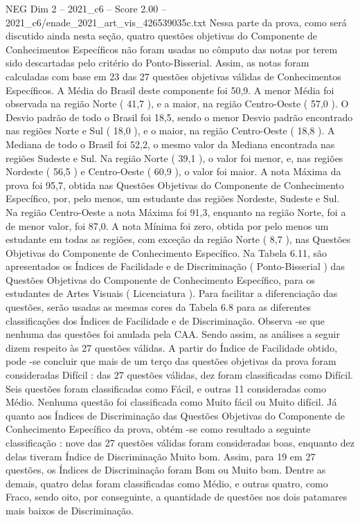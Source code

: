 \begin{textsample}{NEG Dim 2 – 2021\_c6 – Score 2.00 – 2021\_c6/enade\_2021\_art\_vis\_426539035c.txt}
Nessa parte da prova, como será discutido ainda nesta seção, quatro questões objetivas do Componente de Conhecimentos Específicos não foram usadas no cômputo das notas por terem sido descartadas pelo critério do Ponto-Bisserial.
Assim, as notas foram calculadas com base em 23 das 27 questões objetivas válidas de Conhecimentos Específicos.
A Média do Brasil deste componente foi 50,9.
A menor Média foi observada na região Norte ( 41,7 ), e a maior, na região Centro-Oeste ( 57,0 ).
O Desvio padrão de todo o Brasil foi 18,5, sendo o menor Desvio padrão encontrado nas regiões Norte e Sul ( 18,0 ), e o maior, na região Centro-Oeste ( 18,8 ).
A Mediana de todo o Brasil foi 52,2, o mesmo valor da Mediana encontrada nas regiões Sudeste e Sul.
Na região Norte ( 39,1 ), o valor foi menor, e, nas regiões Nordeste ( 56,5 ) e Centro-Oeste ( 60,9 ), o valor foi maior.
A nota Máxima da prova foi 95,7, obtida nas Questões Objetivas do Componente de Conhecimento Específico, por, pelo menos, um estudante das regiões Nordeste, Sudeste e Sul.
Na região Centro-Oeste a nota Máxima foi 91,3, enquanto na região Norte, foi a de menor valor, foi 87,0.
A nota Mínima foi zero, obtida por pelo menos um estudante em todas as regiões, com exceção da região Norte ( 8,7 ), nas Questões Objetivas do Componente de Conhecimento Específico.
Na Tabela 6.11, são apresentados os Índices de Facilidade e de Discriminação ( Ponto-Bisserial ) das Questões Objetivas do Componente de Conhecimento Específico, para os estudantes de Artes Visuais ( Licenciatura ).
Para facilitar a diferenciação das questões, serão usadas as mesmas cores da Tabela 6.8 para as diferentes classificações dos Índices de Facilidade e de Discriminação.
Observa -se que nenhuma das questões foi anulada pela CAA.
Sendo assim, as análises a seguir dizem respeito às 27 questões válidas.
A partir do Índice de Facilidade obtido, pode -se concluir que mais de um terço das questões objetivas da prova foram consideradas Difícil : das 27 questões válidas, dez foram classificadas como Difícil.
Seis questões foram classificadas como Fácil, e outras 11 consideradas como Médio.
Nenhuma questão foi classificada como Muito fácil ou Muito difícil.
Já quanto aos Índices de Discriminação das Questões Objetivas do Componente de Conhecimento Específico da prova, obtém -se como resultado a seguinte classificação : nove das 27 questões válidas foram consideradas boas, enquanto dez delas tiveram Índice de Discriminação Muito bom.
Assim, para 19 em 27 questões, os Índices de Discriminação foram Bom ou Muito bom.
Dentre as demais, quatro delas foram classificadas como Médio, e outras quatro, como Fraco, sendo oito, por conseguinte, a quantidade de questões nos dois patamares mais baixos de Discriminação.

\end{textsample}
